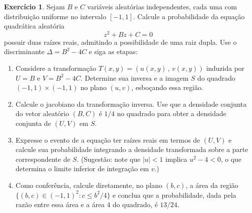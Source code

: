 \documentclass[12pt,portuguese]{article}
\let\le\leqslant
\theoremstyle{definition}
\theoremstyle{plainexercise}
\newtheorem{exercise}{Exercício}
\theoremstyle{starredexercise}
\theoremstyle{definition}
\begin{document}
\begin{exercise}\label{exercise:probabilidade-raizes-reais}
  Sejam $B$ e $C$ variáveis aleatórias independentes, cada uma com
  distribuição uniforme no intervalo $[-1,1]$. Calcule a probabilidade da
  equação quadrática aleatória
  \[
    z^2 + Bz + C = 0
  \]
  possuir duas raízes reais, admitindo a possibilidade de uma raiz dupla.
  Use o discriminante $\Delta = B^2 - 4C$ e siga as etapas:
  \begin{enumerate}
    \item Considere a transformação $T(x,y)=(u(x,y)\, ,\, v(x,y))$ induzida por 
    $U=B$ e $V=B^2-4C$. Determine sua
      inversa e a imagem $S$ do quadrado $(-1,1)\times(-1,1)$ no plano $(u,v)$,
      esboçando essa região.
    \item Calcule o jacobiano da transformação inversa. Use que a densidade
      conjunta do vetor aleatório $(B,C)$ é $1/4$ no quadrado para obter a densidade conjunta
      de $(U,V)$ em $S$.
    \item Expresse o evento de a equação ter raízes reais em termos de
      $(U,V)$ e calcule sua probabilidade integrando a densidade transformada
      sobre a parte correspondente de $S$. (Sugestão: note que $|u| < 1$
      implica $u^2-4 < 0$, o que determina o limite inferior de integração
      em $v$.)
    \item Como conferência, calcule diretamente, no plano $(b,c)$, a área da
      região $\{(b,c) \in (-1,1)^2 : c \le b^2/4\}$ e conclua que a
      probabilidade, dada pela razão entre essa área e a área $4$ do
      quadrado, é $13/24$.
  \end{enumerate}
\end{exercise}




\end{document}
